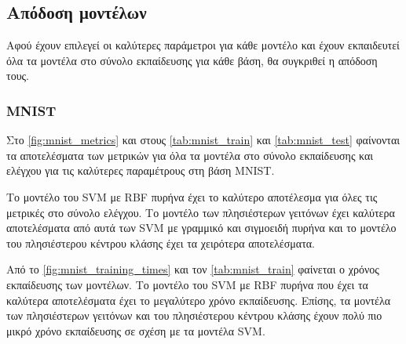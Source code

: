 \documentclass[a4paper]{article}
\begin{document}
\subsection{Απόδοση μοντέλων}

Αφού έχουν επιλεγεί οι καλύτερες παράμετροι για κάθε μοντέλο και έχουν
εκπαιδευτεί όλα τα μοντέλα στο σύνολο εκπαίδευσης για κάθε βάση, θα συγκριθεί η
απόδοση τους.

\subsubsection{MNIST}

Στο \autoref{fig:mnist_metrics} και στους \autoref{tab:mnist_train} και
\autoref{tab:mnist_test} φαίνονται τα αποτελέσματα των μετρικών για όλα τα
μοντέλα στο σύνολο εκπαίδευσης και ελέγχου για τις καλύτερες παραμέτρους στη
βάση MNIST.

Το μοντέλο του SVM με RBF πυρήνα έχει το καλύτερο αποτέλεσμα για όλες τις
μετρικές στο σύνολο ελέγχου. Το μοντέλο των πλησιέστερων γειτόνων έχει καλύτερα
αποτελέσματα από αυτά των SVM με γραμμικό και σιγμοειδή πυρήνα και το μοντέλο
του πλησιέστερου κέντρου κλάσης έχει τα χειρότερα αποτελέσματα.

Από το \autoref{fig:mnist_training_times} και τον \autoref{tab:mnist_train}
φαίνεται ο χρόνος εκπαίδευσης των μοντέλων. Το μοντέλο του SVM με RBF πυρήνα που
έχει τα καλύτερα αποτελέσματα έχει το μεγαλύτερο χρόνο εκπαίδευσης. Επίσης, τα
μοντέλα των πλησιέστερων γειτόνων και του πλησιέστερου κέντρου κλάσης έχουν πολύ
πιο μικρό χρόνο εκπαίδευσης σε σχέση με τα μοντέλα SVM.
\end{document}
